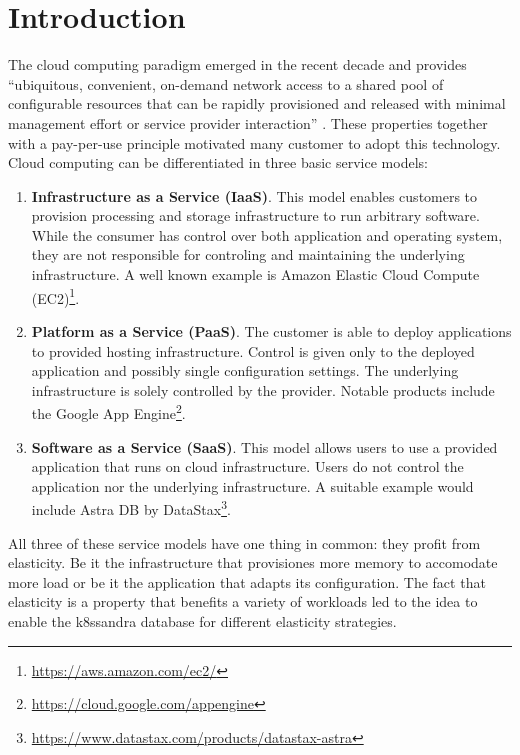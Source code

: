 \chapter{Introduction}
\label{ch:introduction}

The cloud computing paradigm emerged in the recent decade and provides ``ubiquitous, convenient, on-demand network access to a shared pool of configurable resources that can be rapidly provisioned and released with minimal management effort or service provider interaction'' \cite{mellNISTDefinitionCloud2011a}. These properties together with a pay-per-use principle motivated many customer to adopt this technology. Cloud computing can be differentiated in three basic service models:

\begin{enumerate}
    \item \textbf{Infrastructure as a Service (IaaS)}. This model enables customers to provision processing and storage infrastructure to run arbitrary software. While the consumer has control over both application and operating system, they are not responsible for controling and maintaining the underlying infrastructure. A well known example is Amazon Elastic Cloud Compute (EC2)\footnote{\url{https://aws.amazon.com/ec2/}}.

    \item \textbf{Platform as a Service (PaaS)}. The customer is able to deploy applications to provided hosting infrastructure. Control is given only to the deployed application and possibly single configuration settings. The underlying infrastructure is solely controlled by the provider. Notable products include the Google App Engine\footnote{\url{https://cloud.google.com/appengine}}.

    \item \textbf{Software as a Service (SaaS)}. This model allows users to use a provided application that runs on cloud infrastructure. Users do not control the application nor the underlying infrastructure. A suitable example would include Astra DB by DataStax\footnote{\url{https://www.datastax.com/products/datastax-astra}}.
\end{enumerate}

All three of these service models have one thing in common: they profit from elasticity. Be it the infrastructure that provisiones more memory to accomodate more load or be it the application that adapts its configuration. The fact that elasticity is a property that benefits a variety of workloads led to the idea to enable the k8ssandra database for different elasticity strategies.

